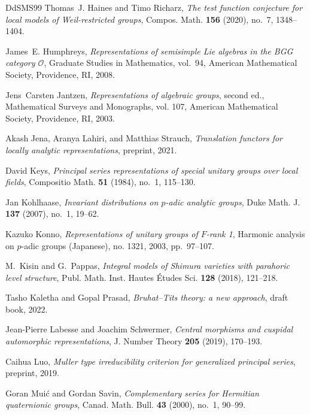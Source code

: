 \documentclass[a4paper]{amsart}
\numberwithin{equation}{section}
\theoremstyle{remark}
\theoremstyle{definition}
\begin{document}
\begin{thebibliography}{DdSMS99}
Thomas~J. Haines and Timo Richarz, \emph{The test function conjecture for local
  models of {W}eil-restricted groups}, Compos. Math. \textbf{156} (2020),
  no.~7, 1348--1404. 

James~E. Humphreys, \emph{Representations of semisimple {L}ie algebras in the
  {BGG} category {$\mathcal{O}$}}, Graduate Studies in Mathematics, vol.~94,
  American Mathematical Society, Providence, RI, 2008. 

Jens~Carsten Jantzen, \emph{Representations of algebraic groups}, second ed.,
  Mathematical Surveys and Monographs, vol. 107, American Mathematical Society,
  Providence, RI, 2003. 

Akash Jena, Aranya Lahiri, and Matthias Strauch, \emph{Translation functors for
  locally analytic representations}, preprint, 2021.

David Keys, \emph{Principal series representations of special unitary groups
  over local fields}, Compositio Math. \textbf{51} (1984), no.~1, 115--130.

Jan Kohlhaase, \emph{Invariant distributions on {$p$}-adic analytic groups},
  Duke Math. J. \textbf{137} (2007), no.~1, 19--62. 

Kazuko Konno, \emph{Representations of unitary groups of {$F$}-rank 1},
  Harmonic analysis on {$p$}-adic groups (Japanese), no. 1321, 2003,
  pp.~97--107.

M.~Kisin and G.~Pappas, \emph{Integral models of {S}himura varieties with
  parahoric level structure}, Publ. Math. Inst. Hautes \'{E}tudes Sci.
  \textbf{128} (2018), 121--218. 

Tasho Kaletha and Gopal Prasad, \emph{Bruhat--{T}its theory: a new approach},
  draft book, 2022.

Jean-Pierre Labesse and Joachim Schwermer, \emph{Central morphisms and cuspidal
  automorphic representations}, J. Number Theory \textbf{205} (2019), 170--193.

Caihua Luo, \emph{Muller type irreducibility criterion for generalized
  principal series}, preprint, 2019.

Goran Mui\'{c} and Gordan Savin, \emph{Complementary series for {H}ermitian
  quaternionic groups}, Canad. Math. Bull. \textbf{43} (2000), no.~1, 90--99.


\end{thebibliography}
\end{document}
